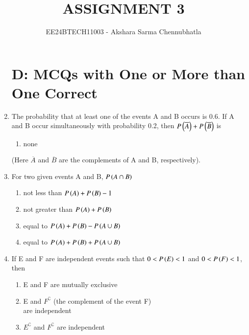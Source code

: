 \documentclass[journal,12pt,twocolumn,article]{IEEEtran}
\theoremstyle{remark}
\begin{document}
\begin{enumerate}[start = 3]

\vspace{3cm}
\title{ASSIGNMENT 3}
\author{EE24BTECH11003 - Akshara Sarma Chennubhatla}
\maketitle
\newpage
\bigskip
\section*{D: MCQs with One or More than One Correct}
\item The probability that at least one of the events A and B occurs is 0.6. If A and B occur simultaneously with probability 0.2, then $P\left(\overline{A}\right)+P\left(\overline{B}\right)$ is
\hfill{}
\begin{enumerate}
\item none
\end{enumerate}
(Here $\overline{A}$ and $\overline{B}$ are the complements of A and B, respectively).
\item For two given events A and B, $P\left(A \cap B\right)$
\hfill{}
\begin{enumerate}
\item not less than $P\left(A\right)+P\left(B\right)-1$
\item not greater than $P\left(A\right)+P\left(B\right)$
\item equal to $P\left(A\right)+P\left(B\right)-P\left(A \cup B\right)$
\item equal to $P\left(A\right)+P\left(B\right)+P\left(A \cup B\right)$
\end{enumerate}
\item If E and F are independent events such that $0<P\left(E\right)<1$ and $0<P\left(F\right)<1$, then 
\hfill{}
\begin{enumerate}
\item E and F are mutually exclusive
\item E and $F^\complement$ (the complement of the event F) \\are independent
\item $E^\complement$ and $F^\complement$ are independent

\end{enumerate}
\end{enumerate}
\end{document}
